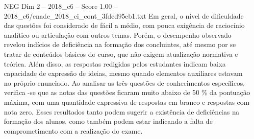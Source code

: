 \begin{textsample}{NEG Dim 2 – 2018\_c6 – Score 1.00 – 2018\_c6/enade\_2018\_ci\_cont\_3fded95eb1.txt}
Em geral, o nível de dificuldade das questões foi considerado de fácil a médio, com pouca exigência de raciocínio analítico ou articulação com outros temas.
Porém, o desempenho observado revelou indícios de deficiência na formação dos concluintes, até mesmo por se tratar de conteúdos básicos do curso, que não exigem atualização normativa e teórica.
Além disso, as respostas redigidas pelos estudantes indicam baixa capacidade de expressão de ideias, mesmo quando elementos auxiliares estavam no próprio enunciado.
Ao analisar as três questões de conhecimentos específicos, verifica -se que as notas das questões ficaram muito abaixo de 50 \% da pontuação máxima, com uma quantidade expressiva de respostas em branco e respostas com nota zero.
Esses resultados tanto podem sugerir a existência de deficiências na formação dos alunos, como também podem estar indicando a falta de comprometimento com a realização do exame.

\end{textsample}
